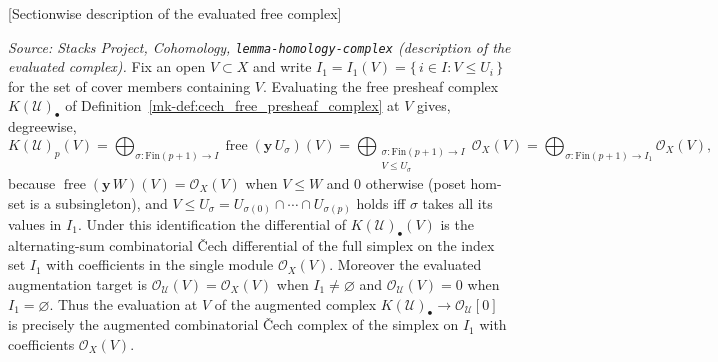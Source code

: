 \begin{lemma}

[Sectionwise description of the evaluated free complex]
  \label{mk-lem:cech_free_eval_sectionwise}

  \textit{Source: Stacks Project, Cohomology, \texttt{lemma-homology-complex}
  (description of the evaluated complex).}
  Fix an open \(V \subset X\) and write \(I_1 = I_1(V) = \{\,i \in I : V \leq U_i\,\}\)
  for the set of cover members containing \(V\). Evaluating the free presheaf complex
  \(K(\mathcal{U})_\bullet\) of Definition~\ref{mk-def:cech_free_presheaf_complex} at
  \(V\) gives, degreewise,
  \[
    K(\mathcal{U})_p(V)
      = \bigoplus_{\sigma : \mathrm{Fin}(p+1) \to I}
        \operatorname{free}(\mathbf{y}\,U_\sigma)(V)
      = \bigoplus_{\substack{\sigma : \mathrm{Fin}(p+1) \to I \\ V \leq U_\sigma}}
        \mathcal{O}_X(V)
      = \bigoplus_{\sigma : \mathrm{Fin}(p+1) \to I_1} \mathcal{O}_X(V),
  \]
  because \(\operatorname{free}(\mathbf{y}\,W)(V) = \mathcal{O}_X(V)\) when
  \(V \leq W\) and \(0\) otherwise (poset hom-set is a subsingleton), and
  \(V \leq U_\sigma = U_{\sigma(0)} \cap \cdots \cap U_{\sigma(p)}\) holds iff
  \(\sigma\) takes all its values in \(I_1\). Under this identification the
  differential of \(K(\mathcal{U})_\bullet(V)\) is the alternating-sum combinatorial
  {\v C}ech differential of the full simplex on the index set \(I_1\) with
  coefficients in the single module \(\mathcal{O}_X(V)\). Moreover the evaluated
  augmentation target is \(\mathcal{O}_{\mathcal{U}}(V) = \mathcal{O}_X(V)\) when
  \(I_1 \neq \varnothing\) and \(\mathcal{O}_{\mathcal{U}}(V) = 0\) when
  \(I_1 = \varnothing\). Thus the evaluation at \(V\) of the augmented complex
  \(K(\mathcal{U})_\bullet \to \mathcal{O}_{\mathcal{U}}[0]\)
  is precisely the augmented combinatorial
  {\v C}ech complex of the simplex on \(I_1\) with coefficients \(\mathcal{O}_X(V)\).
\end{lemma}


